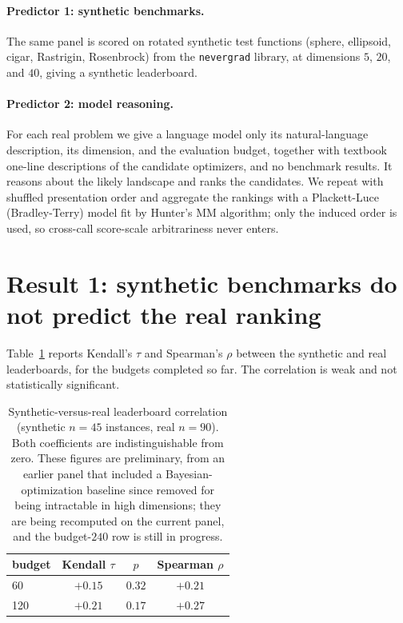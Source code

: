 \documentclass[11pt]{article}
\begin{document}
\paragraph{Predictor 1: synthetic benchmarks.}
The same panel is scored on rotated synthetic test functions (sphere, ellipsoid, cigar,
Rastrigin, Rosenbrock) from the \texttt{nevergrad} library, at dimensions $5$, $20$, and
$40$, giving a synthetic leaderboard.

\paragraph{Predictor 2: model reasoning.}
For each real problem we give a language model only its natural-language description,
its dimension, and the evaluation budget, together with textbook one-line descriptions
of the candidate optimizers, and no benchmark results. It reasons about the likely
landscape and ranks the candidates. We repeat with shuffled presentation order and
aggregate the rankings with a Plackett-Luce (Bradley-Terry) model fit by Hunter's MM
algorithm; only the induced order is used, so cross-call score-scale arbitrariness never
enters.

\section{Result 1: synthetic benchmarks do not predict the real ranking}

Table~\ref{tab:e1} reports Kendall's $\tau$ and Spearman's $\rho$ between the synthetic
and real leaderboards, for the budgets completed so far. The correlation is weak and
not statistically significant.

\begin{table}[h]
\centering
\begin{tabular}{lccc}
\toprule
budget & Kendall $\tau$ & $p$ & Spearman $\rho$ \\
\midrule
60  & $+0.15$ & $0.32$ & $+0.21$ \\
120 & $+0.21$ & $0.17$ & $+0.27$ \\
\bottomrule
\end{tabular}
\caption{Synthetic-versus-real leaderboard correlation (synthetic $n=45$ instances,
real $n=90$). Both coefficients are indistinguishable from zero. These figures are
preliminary, from an earlier panel that included a Bayesian-optimization baseline since
removed for being intractable in high dimensions; they are being recomputed on the
current panel, and the budget-$240$ row is still in progress.}
\label{tab:e1}
\end{table}
\end{document}
